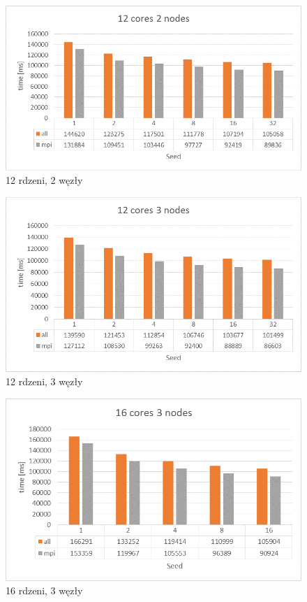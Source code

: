 \documentclass[a4paper]{article}
\begin{document}
\begin{figure}[H]
    \centering
    \includegraphics[width=\textwidth]{1-12c2n.png}
    \caption{12 rdzeni, 2 węzły}
    \label{fig:my_frac}
\end{figure}
\begin{figure}[H]
    \centering
    \includegraphics[width=\textwidth]{1-12c3n.png}
    \caption{12 rdzeni, 3 węzły}
    \label{fig:my_frac}
\end{figure}
\begin{figure}[H]
    \centering
    \includegraphics[width=\textwidth]{1-16c3n.png}
    \caption{16 rdzeni, 3 węzły}
    \label{fig:my_frac}
\end{figure}
\end{document}
